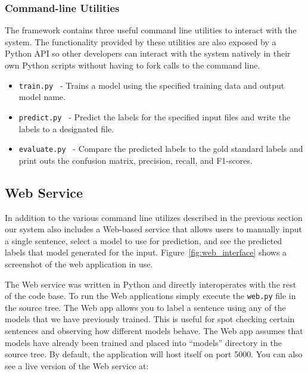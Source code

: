 \documentclass[preprint]{style}
\begin{document}
\subsubsection{Command-line Utilities}


The framework contains three useful command line utilities to interact with the system. The functionality provided by these utilities are also exposed by a Python API so other developers can interact with the system natively in their own Python scripts without having to fork calls to the command line. 

\begin{itemize}

\item {\tt train.py } -  Trains a model using the specified training data and output model name.

\item {\tt predict.py } -  Predict the labels for the specified input files and write the labels to a designated file.

\item {\tt evaluate.py } -  Compare the predicted labels to the gold standard labels and print outs the confusion matrix, precision, recall, and F1-scores. 

\end{itemize}


\subsection{Web Service}

In addition to the various command line utilizes described in the previous section our system also includes a Web-based service that allows users to manually input a single sentence, select a model to use for prediction, and see the predicted labels that model generated for the input. Figure~\ref{fig:web_interface} shows a screenshot of the web application in use.

The Web service was written in Python and directly interoperates with the rest of the code base. To run the Web applications simply execute the {\tt web.py} file in the source tree. The Web app allows you to label a sentence using any of the models that we have previously trained. This is useful for spot checking certain sentences and observing how different models behave. The Web app assumes that models have already been trained and placed into ``models'' directory in the source tree. By default, the application will host itself on port 5000. You can also see a live version of the Web service at:
\end{document}
